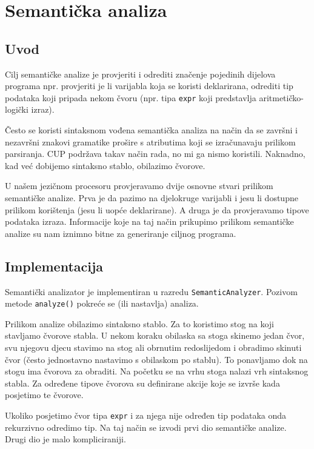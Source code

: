\chapter{Semantička analiza}

\section{Uvod}

Cilj semantičke analize je provjeriti i odrediti značenje pojedinih dijelova programa npr. provjeriti
je li varijabla koja se koristi deklarirana, odrediti tip podataka koji pripada nekom čvoru (npr. tipa \texttt{expr}
koji predstavlja aritmetičko-logički izraz).

Često se koristi sintaksnom vođena semantička analiza na način da se završni i nezavršni znakovi gramatike
prošire s atributima koji se izračunavaju prilikom parsiranja. CUP podržava takav način rada, no
mi ga nismo koristili. Naknadno, kad već dobijemo sintaksno stablo, obilazimo čvorove.

U našem jezičnom procesoru provjeravamo dvije osnovne stvari prilikom semantičke analize. Prva je da pazimo
na djelokruge varijabli i jesu li dostupne prilikom korištenja (jesu li uopće deklarirane). A druga je
da provjeravamo tipove podataka izraza. Informacije koje na taj način prikupimo prilikom semantičke
analize su nam iznimno bitne za generiranje ciljnog programa.


\section{Implementacija}
Semantički analizator je implementiran u razredu \texttt{SemanticAnalyzer}. Pozivom metode \texttt{analyze()}
pokreće se (ili nastavlja) analiza.

Prilikom analize obilazimo sintaksno stablo. Za to koristimo stog na koji stavljamo čvorove stabla.
U nekom koraku obilaska sa stoga skinemo jedan čvor, svu njegovu djecu stavimo na stog ali obrnutim redoslijedom i 
obradimo skinuti čvor (često jednostavno nastavimo s obilaskom po stablu). To ponavljamo dok na stogu ima čvorova za obraditi. 
Na početku se na vrhu stoga nalazi vrh sintaksnog stabla.
Za određene tipove čvorova su definirane akcije koje se izvrše kada posjetimo te čvorove. 

Ukoliko posjetimo čvor tipa \texttt{expr} i za njega nije određen tip podataka onda rekurzivno 
odredimo tip. Na taj način se izvodi prvi dio semantičke analize. Drugi dio je malo kompliciraniji.

